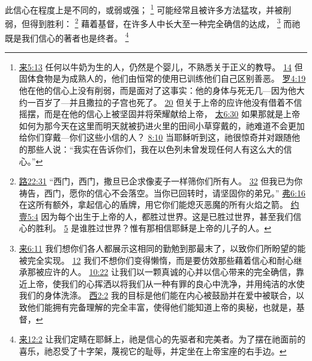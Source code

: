 \documentclass[12pt, a4paper, oneside]{ctexart}
\newcounter{parnum}[section]
\newcommand{\N}{%
   \noindent\refstepcounter{parnum}%
    \makebox[\parindent][l]{\textbf{\arabic{parnum}.}}}
\begin{document}
\N 此信心在程度上是不同的，或弱或强；
	\footnote {
		\href{https://biblehub.com/hebrews/5-13.htm}{来5:13} 任何以牛奶为生的人，仍然是个婴儿，不熟悉关于正义的教导。
		\href{https://biblehub.com/hebrews/5-14.htm}{14} 但固体食物是为成熟人的，他们由恒常的使用已训练他们自己区别善恶。
		\href{https://biblehub.com/romans/4-19.htm}{罗4:19} 他在他的信心上没有削弱，而是面对了这事实：他的身体与死无几---因为他大约一百岁了---并且撒拉的子宫也死了。
		\href{https://biblehub.com/romans/4-20.htm}{20} 但关于上帝的应许他没有借着不信摇摆，而是在他的信心上被坚固并将荣耀献给上帝，
		\href{https://biblehub.com/matthew/6-30.htm}{太6:30} 如果那就是上帝如何为那今天在这里而明天就被扔进火里的田间小草穿戴的，祂难道不会更加给你们穿戴---你们这些小信的人？
		\href{https://biblehub.com/matthew/8-10.htm}{8:10} 当耶稣听到这，祂很惊奇并对跟随他的那些人说：“我实在告诉你们，我在以色列未曾发现任何人有这么大的信心。”
	}
	可能经常且被许多方法猛攻，并被削弱，但得到胜利：
	\footnote {
		\href{https://biblehub.com/luke/22-31.htm}{路22:31} “西门，西门，撒旦已企求像麦子一样筛你们所有人。
		\href{https://biblehub.com/luke/22-32.htm}{32} 但我已为你祷告，西门，愿你的信心不会落空。当你已回转时，请坚固你的弟兄。”
		\href{https://biblehub.com/ephesians/6-16.htm}{弗6:16} 在这所有额外，拿起信心的盾牌，用它你们能熄灭恶魔的所有火焰之箭。
		\href{https://biblehub.com/1_john/5-4.htm}{约壹5:4} 因为每个出生于上帝的人，都胜过世界。这是已胜过世界，甚至我们信心的胜利。
		\href{https://biblehub.com/1_john/5-5.htm}{5} 是谁胜过世界？惟有那相信耶稣是上帝的儿子的人。
	}
	藉着基督，在许多人中长大至一种完全确信的达成，
	\footnote {
		\href{https://biblehub.com/hebrews/6-11.htm}{来6:11} 我们想你们各人都展示这相同的勤勉到那最末了，以致你们所盼望的能被完全实现。
		\href{https://biblehub.com/hebrews/6-12.htm}{12} 我们不想你们变得懒惰，而是要仿效那些藉着信心和耐心继承那被应许的人。
		\href{https://biblehub.com/hebrews/10-22.htm}{10:22} 让我们以一颗真诚的心并以信心带来的完全确信，靠近上帝，使我们的心挥洒以将我们从一种有罪的良心中洗净，并用纯洁的水使我们的身体洗涤。
		\href{https://biblehub.com/colossians/2-2.htm}{西2:2} 我的目标是他们能在内心被鼓励并在爱中被联合，以致他们能拥有完备理解的完全丰富，使得他们能知道上帝的奥秘，也就是，基督，
	}
	而祂既是我们信心的著者也是终者。
	\footnote {
		\href{https://biblehub.com/hebrews/12-2.htm}{来12:2} 让我们定睛在耶稣上，祂是信心的先驱者和完美者。为了摆在祂面前的喜乐，祂忍受了十字架，蔑视它的耻辱，并定坐在上帝宝座的右手边。
	}
\end{document}
